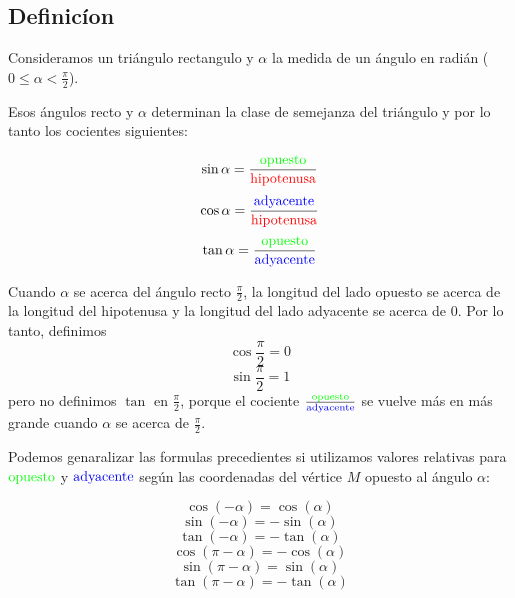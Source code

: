 \subsection{Definicíon}

Consideramos un triángulo rectangulo y $\alpha$ la medida de un ángulo en
radián ($0 \leq \alpha < \frac{\pi}{2}$).

\begin{center}
\end{center}

Esos ángulos recto y $\alpha$ determinan la clase de semejanza del
triángulo y por lo tanto los cocientes siguientes:

$$
\sin \alpha = \frac{\color{green}{\text{opuesto}}}
{\text{\color{red}{\text{hipotenusa}}}}
$$
$$
\cos \alpha = \frac{\color{blue}{\text{adyacente}}}
{\text{\color{red}{\text{hipotenusa}}}}
$$
$$
\tan \alpha = \frac{\color{green}{\text{opuesto}}}
{\text{\color{blue}{\text{adyacente}}}}
$$

Cuando $\alpha$ se acerca del ángulo recto $\frac{\pi}{2}$, la longitud
del lado opuesto se acerca de la longitud del hipotenusa y la longitud
del lado adyacente se acerca de 0. Por lo tanto, definimos
$$
\cos \frac{\pi}{2} = 0
$$
$$
\sin \frac{\pi}{2} = 1
$$
pero no definimos $\tan$ en $\frac{\pi}{2}$, porque el cociente
$\frac{\color{green}{\text{opuesto}}}
{\text{\color{blue}{\text{adyacente}}}}$ se vuelve más en más grande cuando
$\alpha$ se acerca de $\frac{\pi}{2}$.

Podemos genaralizar las formulas precedientes si utilizamos valores
relativas para
$\color{green}{\text{opuesto}}$ y ${\text{\color{blue}{\text{adyacente}}}}$
según las coordenadas del vértice $M$ opuesto al ángulo $\alpha$:

$$\cos{(-\alpha)} = \cos{(\alpha)}$$
$$\sin{(-\alpha)} = -\sin{(\alpha)}$$
$$\tan{(-\alpha)} = -\tan{(\alpha)}$$
$$\cos{(\pi-\alpha)} = -\cos{(\alpha)}$$
$$\sin{(\pi-\alpha)} = \sin{(\alpha)}$$
$$\tan{(\pi-\alpha)} = -\tan{(\alpha)}$$

